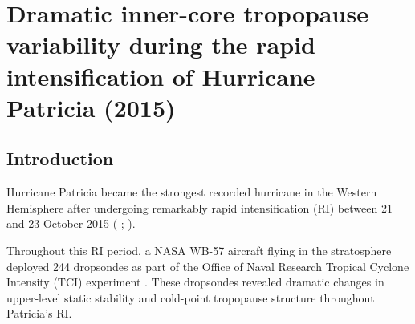  
\chapter{Dramatic inner-core tropopause variability during the rapid intensification of {Hurricane Patricia} (2015)}
\label{chapter:patricia}
\resetfootnote %



\section{Introduction}

Hurricane Patricia became the strongest recorded hurricane in the Western Hemisphere after undergoing remarkably rapid intensification (RI) between 21 and 23 October 2015 (\citeauthor{Kimberlainetal2016} \citeyear{Kimberlainetal2016}; \citeauthor{Rogersetal2017} \citeyear{Rogersetal2017}).

Throughout this RI period, a NASA WB-57 aircraft flying in the stratosphere deployed 244 dropsondes as part of the Office of Naval Research Tropical Cyclone Intensity (TCI) experiment \citep{DoyleTCI}.
These dropsondes revealed dramatic changes in upper-level static stability and cold-point tropopause structure throughout Patricia’s RI.

